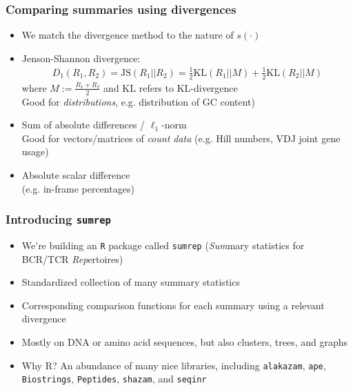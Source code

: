 \documentclass[mathserif,compress]{beamer}
\newcommand*\ba{\[ \begin{aligned}}
\newcommand*\ea{\end{aligned} \]}
\renewcommand\;{\,}
\begin{document}
\begin{frame}\frametitle{Comparing summaries using divergences}
\begin{itemize}
\item
We match the divergence method to the nature of $s(\cdot)$
\bigskip
\item
Jenson-Shannon divergence:
\ba
D_{1}(R_1, R_2) =
\text{JS}(R_1 || R_2) = \frac{1}{2} \text{KL}(R_1 || M) + \frac{1}{2} \text{KL}(R_2 || M)
\ea
where $M := \frac{R_1 + R_2}{2}$ and $\text{KL}$ refers to  KL-divergence
\\ \vspace{0.5em} 
Good for \emph{distributions}, e.g. distribution of GC content)
\bigskip
\item
Sum of absolute differences / $\ell_1$-norm
\\ \vspace{0.5em}
Good for vectors/matrices of \emph{count data} (e.g. Hill numbers, VDJ joint gene usage)
\bigskip
\item
Absolute scalar difference \\
(e.g. in-frame percentages)
\end{itemize}
\end{frame}


\begin{frame}\frametitle{Introducing \texttt{sumrep}}
\begin{itemize}
\item
We're building an \texttt{R} package called \texttt{sumrep} (\emph{Sum}mary statistics for BCR/TCR \emph{Rep}ertoires)
\bigskip
\item
Standardized collection of many summary statistics 
\bigskip
\item
Corresponding comparison functions for each summary using a relevant divergence
\bigskip
\item
Mostly on DNA or amino acid sequences, but also clusters, trees, and graphs
\bigskip
\item
Why R? An abundance of many nice libraries, including \texttt{alakazam},
\texttt{ape}, \texttt{Biostrings}, \texttt{Peptides}, \texttt{shazam}, and \texttt{seqinr}
\end{itemize}
\end{frame}
\end{document}
